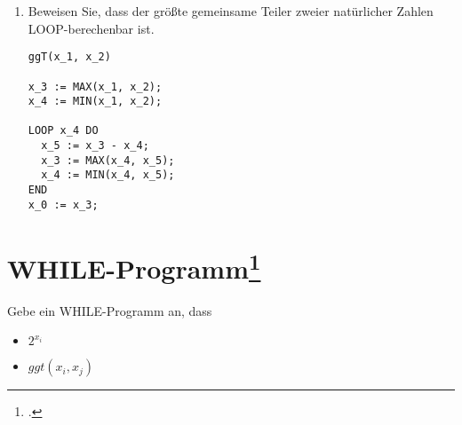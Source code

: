 \documentclass{lehramt-informatik-aufgabe}
\begin{document}
\begin{enumerate}
\begin{enumerate}
\begin{liAntwort}
\begin{verbatim}
x_0 := succ(0);
LOOP x_j DO
  x_0 := power(x_i, x_0);
END
\end{verbatim}
\end{liAntwort}

\item $2^{x_i}$

\begin{liAntwort}
Mit \emph{power}

\begin{verbatim}
x_0 := power(2, x_i);
\end{verbatim}

Mit \emph{mult}

\begin{verbatim}
x_0 := 1;
x_2 := 2;
LOOP x_i DO
  x0 := mult(x_0, x_2);
END
\end{verbatim}
\end{liAntwort}
\end{enumerate}

an.

\item Beweisen Sie, dass der größte gemeinsame Teiler zweier natürlicher
Zahlen LOOP-berechenbar ist.

\begin{liAntwort}
\begin{verbatim}
ggT(x_1, x_2)

x_3 := MAX(x_1, x_2);
x_4 := MIN(x_1, x_2);

LOOP x_4 DO
  x_5 := x_3 - x_4;
  x_3 := MAX(x_4, x_5);
  x_4 := MIN(x_4, x_5);
END
x_0 := x_3;
\end{verbatim}
\end{liAntwort}

\end{enumerate}

%

\section{WHILE-Programm\footcite[Seite 16]{theo:fs:4}}

Gebe ein WHILE-Programm an, dass

\begin{itemize}
\item $2^{x_i}$
\item $ggt(x_i, x_j)$
\end{itemize}
\end{document}
